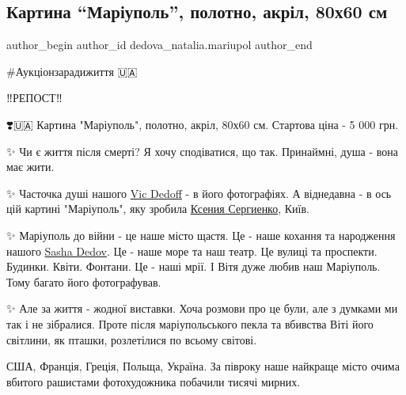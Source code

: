  
 
 
 
 

\subsection{Картина \enquote{Маріуполь}, полотно, акріл, 80х60 см}
\label{sec:24_09_2022.fb.dedova_natalia.mariupol.1.kartina__mar_upol___}

\ifcmt
 author_begin
   author_id dedova_natalia.mariupol
 author_end
\fi

\#Аукціонзарадижиття 🇺🇦

‼️РЕПОСТ‼️

❣️🇺🇦 Картина "Маріуполь", полотно, акріл, 80х60 см. Стартова ціна - 5 000 грн. 

✨ Чи є життя після смерті? Я хочу  сподіватися, що так. Принаймні, душа - вона
має жити. 

✨ Часточка душі нашого \href{https://www.facebook.com/vic.dedoff}{Vic Dedoff} - в його фотографіях. А віднедавна - в ось
цій картині "Маріуполь", яку зробила \href{https://www.facebook.com/o.serhiienko}{Ксения Сергиенко}, Київ. 

✨ Маріуполь до війни - це наше місто щастя. Це - наше кохання та народження
нашого \href{https://www.facebook.com/sasha.dedov.7315}{Sasha Dedov}. Це - наше море та наш театр. Це вулиці та проспекти.
Будинки. Квіти. Фонтани. Це - наші мрії. І Вітя дуже любив наш Маріуполь. Тому
багато його фотографував. 

✨ Але за життя - жодної виставки. Хоча розмови про це були, але з думками ми
так і не зібралися. Проте після маріупольського пекла та вбивства Віті його
світлини, як пташки, розлетілися по всьому світові. 

США, Франція, Греція, Польща, Україна. За півроку наше найкраще місто очима
вбитого рашистами фотохудожника побачили тисячі мирних. 

